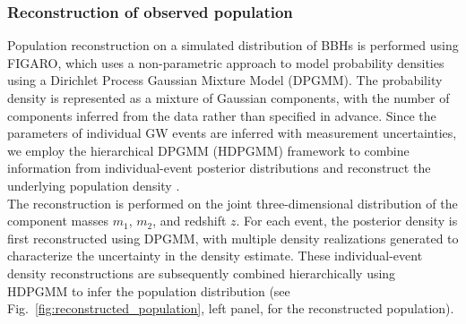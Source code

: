 \documentclass[pdflatex,sn-mathphys-num]{sn-jnl}%
\theoremstyle{thmstyleone}%
\theoremstyle{thmstyletwo}%
\theoremstyle{thmstylethree}%
\begin{document}
\subsubsection{Reconstruction of observed population}
Population reconstruction on a simulated distribution of BBHs is performed using FIGARO, which uses a 
non-parametric approach to model probability densities using a Dirichlet Process Gaussian Mixture Model 
(DPGMM). The probability density is represented as a mixture of Gaussian components, with the number of 
components inferred from the data rather than specified in advance. Since the parameters of individual 
GW events are inferred with measurement uncertainties, we employ the hierarchical DPGMM (HDPGMM) framework 
to combine information from individual-event posterior distributions and reconstruct the underlying 
population density \cite{29}.\\
The reconstruction is performed on the joint three-dimensional distribution of the component masses $m_1$, 
$m_2$, and redshift $z$. For each event, the posterior density is first reconstructed using DPGMM, with 
multiple density realizations generated to characterize the uncertainty in the density estimate. These 
individual-event density reconstructions are subsequently combined hierarchically using HDPGMM to infer 
the population distribution
(see Fig.~\ref{fig:reconstructed_population}, left panel, for the reconstructed population). 
\end{document}
